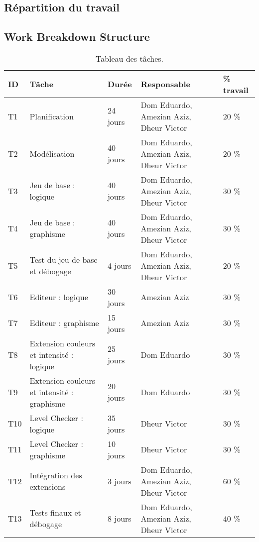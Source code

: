 \documentclass[]{article}
\begin{document}
\newpage
\begin{samepage}
\section{Répartition du travail}

\subsection{Work Breakdown Structure}

\begin{table}[htbp]
\begin{center}
\begin{tabular}{|p{1cm}|p{4cm}||p{2cm}|p{2.5cm}|p{2cm}|}
\hline
\textbf{ID} & T\^ache & Durée & Responsable & \% travail\\
\hline\hline
T1 & Planification & 24 jours & Dom Eduardo, Amezian Aziz, Dheur Victor & 20 \%\\
\hline
T2 & Modélisation & 40 jours & Dom Eduardo, Amezian Aziz, Dheur Victor & 20 \%\\
\hline
T3 & Jeu de base : logique & 40 jours & Dom Eduardo, Amezian Aziz, Dheur Victor & 30 \%\\
\hline
T4 & Jeu de base : graphisme & 40 jours & Dom Eduardo, Amezian Aziz, Dheur Victor & 30 \%\\
\hline
T5 & Test du jeu de base et débogage & 4 jours & Dom Eduardo, Amezian Aziz, Dheur Victor & 20 \%\\
\hline
T6 & Editeur : logique & 30 jours & Amezian Aziz & 30 \%\\
\hline
T7 & Editeur : graphisme & 15 jours & Amezian Aziz & 30 \%\\
\hline
T8 & Extension couleurs et intensité : logique & 25 jours & Dom Eduardo & 30 \%\\
\hline
T9 & Extension couleurs et intensité : graphisme & 20 jours & Dom Eduardo & 30 \%\\
\hline
T10 & Level Checker : logique & 35 jours & Dheur Victor & 30 \%\\
\hline
T11 & Level Checker : graphisme & 10 jours & Dheur Victor & 30 \%\\
\hline
T12 & Intégration des extensions & 3 jours & Dom Eduardo, Amezian Aziz, Dheur Victor & 60 \%\\
\hline
T13 & Tests finaux et débogage & 8 jours & Dom Eduardo, Amezian Aziz, Dheur Victor & 40 \%\\
\hline
\end{tabular}
\end{center}
   \caption{Tableau des t\^aches.}
   \label{tab:WBS}
\end{table}




\end{samepage}
\end{document}
